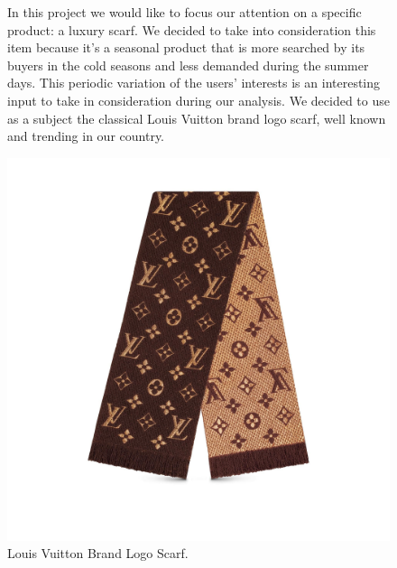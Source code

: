 \begin{figure}[!htp] 
	\begin{flushleft}
		In this project we would like to focus our attention on a specific product: a luxury scarf. We decided to take into consideration this item because it's a seasonal product that is more searched by its buyers in the cold seasons and less demanded during the summer days. This periodic variation of the users' interests is an interesting input to take in consideration during our analysis. We decided to use as a subject the classical Louis Vuitton brand logo scarf, well known and trending in our country.
	\end{flushleft}
	\centering
	\includegraphics[width=0.8\linewidth]{sections/productLogo}
	\caption{Louis Vuitton Brand Logo Scarf.}
\end{figure}
\clearpage